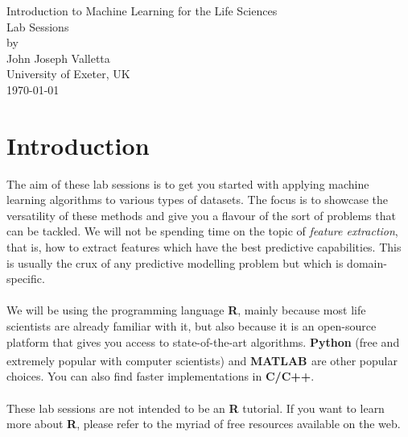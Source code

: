 \documentclass[a4paper,11pt]{article}
\begin{document}
\begin{center}
{\huge Introduction to Machine Learning for the Life Sciences\\[0.5cm]
Lab Sessions}\\[0.5cm]
by\\[0.5cm]
John Joseph Valletta\\
University of Exeter, UK\\[0.5cm]
{\large \today}\\[4cm]
\end{center}

\section*{Introduction}
The aim of these lab sessions is to get you started with applying machine learning
algorithms to various types of datasets. The focus is to showcase the versatility of
these methods and give you a flavour of the sort of problems that can be tackled.
We will not be spending time on the topic of \textit{feature extraction}, 
that is, how to extract features which have the best predictive capabilities. This is
usually the crux of any predictive modelling problem but which is domain-specific.
\\\\
We will be using the programming language \textbf{R}, mainly because most life scientists
are already familiar with it, but also because it is an open-source platform that gives you
access to state-of-the-art algorithms. \textbf{Python} (free and extremely 
popular with computer scientists) and \textbf{MATLAB \textsuperscript{\textregistered}} are other
popular choices. You can also find faster implementations in \textbf{C/C++}.
\\\\
These lab sessions are not intended to be an \textbf{R} tutorial. If you want to learn more
about \textbf{R}, please refer to the myriad of free resources available on the web.
\end{document}

